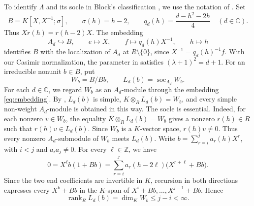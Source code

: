 \documentclass[11pt,reqno]{amsart}
\numberwithin{equation}{section}
\newcommand{\C}{\mathbb C}
\newcommand{\Z}{\mathbb Z}
\DeclareMathOperator{\soc}{soc}
\DeclareMathOperator{\rank}{rank}
\theoremstyle{definition}
\theoremstyle{remark}
\begin{document}
To identify \(\Lambda\) and its socle in Block's classification
\cite{Bavula90,Block81}, we use the notation of \cite{Maz10}.
Set
\begin{equation}\label{eq:B}
B=K[X,X^{-1};\sigma],\qquad \sigma(h)=h-2,\qquad
q_d(h)=\frac{d-h^2-2h}{4}\quad(d\in\C).
\end{equation}
Thus \(Xr(h)=r(h-2)X\). The embedding
\begin{equation}\label{eq:embedding}
A_d\hookrightarrow B,\qquad
e\longmapsto X,\qquad f\longmapsto q_d(h)X^{-1},\qquad h\longmapsto h
\end{equation}
identifies \(B\) with the localization of \(A_d\) at
\(R\setminus\{0\}\), since \(X^{-1}=q_d(h)^{-1}f\).
With our Casimir normalization, the parameter in \cite{Maz10}
satisfies \((\lambda+1)^2=d+1\).
For an irreducible nonunit \(b\in B\), put
\begin{equation}\label{eq:BB}
W_b=B/Bb,\qquad L_d(b)=\soc_{A_d}W_b.
\end{equation}
For each \(d\in\C\), we regard \(W_b\) as an \(A_d\)-module
through the embedding \eqref{eq:embedding}.
By \cite[Proposition~6.2.8 and Theorem~6.3.6]{Maz10},
\(L_d(b)\) is simple, \(K\otimes_R L_d(b)=W_b\), and every
simple non-weight \(A_d\)-module is obtained in this way.
The socle is essential. Indeed, for each nonzero \(v\in W_b\),
the equality \(K\otimes_R L_d(b)=W_b\) gives a nonzero
\(r(h)\in R\) such that \(r(h)v\in L_d(b)\).
Since \(W_b\) is a \(K\)-vector space, \(r(h)v\ne0\).
Thus every nonzero \(A_d\)-submodule of \(W_b\) meets
\(L_d(b)\).
Write \(b=\sum_{r=i}^j a_r(h)X^r\), with \(i<j\) and
\(a_i a_j\ne0\). For every \(\ell\in\Z\), we have
\[
0=X^\ell b(1+Bb)
=\sum_{r=i}^j a_r(h-2\ell)\bigl(X^{r+\ell}+Bb\bigr).
\]
Since the two end coefficients are invertible in \(K\), recursion
in both directions expresses every \(X^k+Bb\) in the \(K\)-span of
\(X^i+Bb,\ldots,X^{j-1}+Bb\). Hence
\[
\rank_R L_d(b)=\dim_K W_b\le j-i<\infty.
\]
\end{document}
